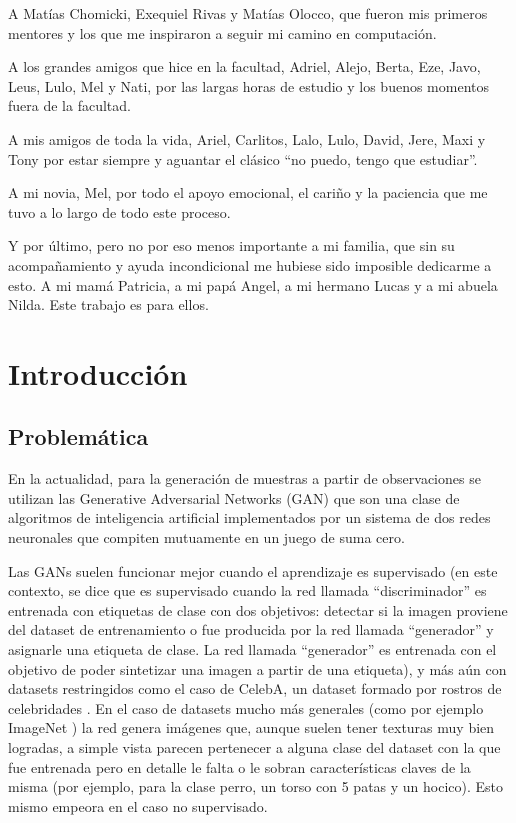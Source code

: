 \documentclass[spanish]{report}
\begin{document}
A Matías Chomicki, Exequiel Rivas y Matías Olocco, que fueron mis primeros mentores y los que me inspiraron a seguir mi camino en computación.

A los grandes amigos que hice en la facultad, Adriel, Alejo, Berta, Eze, Javo, Leus, Lulo, Mel y Nati, por las largas horas de estudio y los buenos momentos fuera de la facultad.

A mis amigos de toda la vida, Ariel, Carlitos, Lalo, Lulo, David, Jere, Maxi y Tony por estar siempre y aguantar el clásico ``no puedo, tengo que estudiar''.

A mi novia, Mel, por todo el apoyo emocional, el cariño y la paciencia que me tuvo a lo largo de todo este proceso.

Y por último, pero no por eso menos importante a mi familia, que sin su acompañamiento y ayuda incondicional me hubiese sido imposible dedicarme a esto. A mi mamá Patricia, a mi papá Angel, a mi hermano Lucas y a mi abuela Nilda. Este trabajo es para ellos.

\newpage


\tableofcontents

\newpage


\chapter{Introducción}

\section{Problemática}
En la actualidad, para la generación de muestras a partir de observaciones se utilizan las Generative Adversarial Networks (GAN) \cite{goodfellow_generative_2014} que son una clase de algoritmos de inteligencia artificial implementados por un sistema de dos redes neuronales que compiten mutuamente en un juego de suma cero.

Las GANs suelen funcionar mejor cuando el aprendizaje es supervisado (en este contexto, se dice que es supervisado cuando la red llamada ``discriminador'' es entrenada con etiquetas de clase con dos objetivos: detectar si la imagen proviene del dataset de entrenamiento o fue producida por la red llamada ``generador'' y asignarle una etiqueta de clase. La red llamada ``generador'' es entrenada con el objetivo de poder sintetizar una imagen a partir de una etiqueta), y más aún con datasets restringidos como el caso de CelebA, un dataset formado por rostros de celebridades \cite{celebA}. En el caso de datasets mucho más generales (como por ejemplo ImageNet \cite{imagenet_cvpr09}) la red genera imágenes que, aunque suelen tener texturas muy bien logradas, a simple vista parecen pertenecer a alguna clase del dataset con la que fue entrenada pero en detalle le falta o le sobran características claves de la misma (por ejemplo, para la clase perro, un torso con 5 patas y un hocico). Esto mismo empeora en el caso no supervisado.
\end{document}
